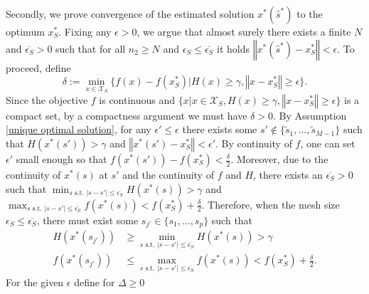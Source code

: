 \documentclass[mnsc,blindrev]{informs4} %
\newcommand{\norm}[1]{\left \Vert #1 \right\Vert}
\begin{document}
Secondly, we prove convergence of the estimated solution $x^*(\hat s^*)$ to the optimum $x_S^*$. Fixing any $\epsilon>0$, we argue that almost surely there exists a finite $N$ and $\overline{\epsilon_S}>0$ such that for all $n_2\geq N$ and $\epsilon_S\leq\overline{\epsilon_S}$ it holds $\norm{x^*(\hat s^*)-x_S^*}<\epsilon$. To proceed, define
\begin{equation}\label{growth}
\delta:=\min_{x\in\mathcal X_S}\{f(x)-f(x_S^*)\vert H(x)\geq\gamma,\norm{x-x_S^*}\geq \epsilon\}.
\end{equation}
Since the objective $f$ is continuous and $\{x\vert x\in\mathcal X_S,H(x)\geq\gamma,\norm{x-x_S^*}\geq \epsilon\}$ is a compact set, by a compactness argument we must have $\delta>0$. By Assumption \ref{unique optimal solution}, for any $\epsilon'\leq \epsilon$ there exists some $s'\notin \{\tilde s_1,\ldots,\tilde s_{M-1}\}$ such that $H(x^*(s'))>\gamma$ and $\norm{x^*(s')-x_S^*}<\epsilon'$. By continuity of $f$, one can set $\epsilon'$ small enough so that $f(x^*(s'))-f(x_S^*)< \frac{\delta}{2}$. Moreover, due to the continuity of $x^*(s)$ at $s'$ and the continuity of $f$ and $H$, there exists an $\overline{\epsilon_S}>0$ such that $\min_{s\text{ s.t. }\lvert s-s'\rvert\leq \overline{\epsilon_S}}H(x^*(s))>\gamma$ and $\max_{s\text{ s.t. }\lvert s-s'\rvert\leq \overline{\epsilon_S}}f(x^*(s))<f(x_S^*)+ \frac{\delta}{2}$. Therefore, when the mesh size $\epsilon_S\leq \overline{\epsilon_S}$, there must exist some $s_{j'}\in \{s_1,\ldots,s_p\}$ such that
\begin{align}
 H(x^*(s_{j'}))&\geq \min_{s\text{ s.t. }\lvert s-s'\rvert\leq \overline{\epsilon_S}}H(x^*(s))>\gamma\label{uniform lower bound of H}\\
f(x^*(s_{j'}))&\leq \max_{s\text{ s.t. }\lvert s-s'\rvert\leq \overline{\epsilon_S}}f(x^*(s))<f(x_S^*)+ \frac{\delta}{2}.\label{feasible near-optimal}
\end{align}
For the given $\epsilon$ define for $\Delta\geq 0$
\end{document}
